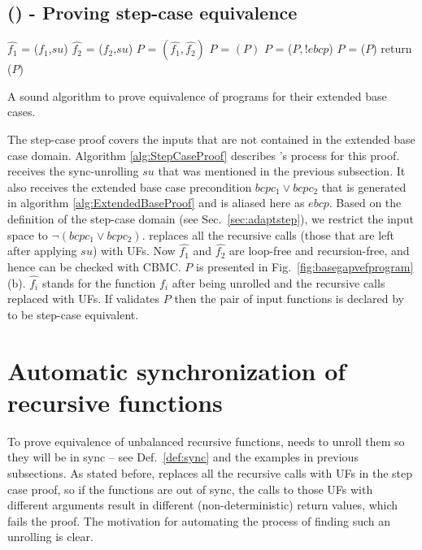 \subsection{() - Proving step-case equivalence}
\label{sec:SIMPLE-STEP-EQUIV}
\noindent
\begin{algorithm}
\begin{minipage}{\linewidth}
\begin{algorithmic}[1]
	\State$\hat{f_1}$ = ($f_1$,$su$)
	\State$\hat{f_2}$ = ($f_2$,$su$)
	\State $P$ = $(\hat{f_1},\hat{f_2})$
	\State $P$ = $(P)$
	\State $P$ = ($P,!ebcp$)
    \State $P$ = ($P$)
    \State return ($P$)
	\EndFunction
\end{algorithmic}
\end{minipage}
\caption{A sound algorithm to prove equivalence of programs for their extended base cases.}
\label{alg:StepCaseProof}
\end{algorithm}
The step-case proof covers the inputs that are not contained in the extended base case domain. Algorithm \ref{alg:StepCaseProof} describes 's process for this proof.
 receives the sync-unrolling $su$ that was mentioned in the previous subsection. It also receives the extended base case precondition $bcpc_1 \lor bcpc_2$ that is generated in algorithm \ref{alg:ExtendedBaseProof} and is aliased here as $ebcp$. Based on the definition of the step-case domain (see Sec.~\ref{sec:adaptstep}), we restrict the input space to $\lnot(bcpc_1 \lor bcpc_2)$.   replaces all the recursive calls (those that are left after applying $su$) with UFs. Now $\hat{f_1}$ and $\hat{f_2}$ are loop-free and recursion-free, and hence can be checked with CBMC. $P$ is presented in Fig.~\ref{fig:basegapvefprogram} (b). $\hat{f_i}$ stands for the function $f_i$ after being unrolled and the recursive calls replaced with UFs. If  validates $P$ then the pair of input functions is declared by  to be step-case equivalent. 


\section{Automatic synchronization of recursive functions}
\label{sec:synch}
To prove equivalence of unbalanced recursive functions,  needs to unroll them so they will be in sync -- see Def.~\ref{def:sync} and the examples in previous subsections. As stated before,  replaces all the recursive calls with UFs in the step case proof, so if the functions are out of sync, the calls to those UFs with different arguments result in different (non-deterministic) return values, which fails the proof. The motivation for automating the process of finding such an unrolling is clear. 

